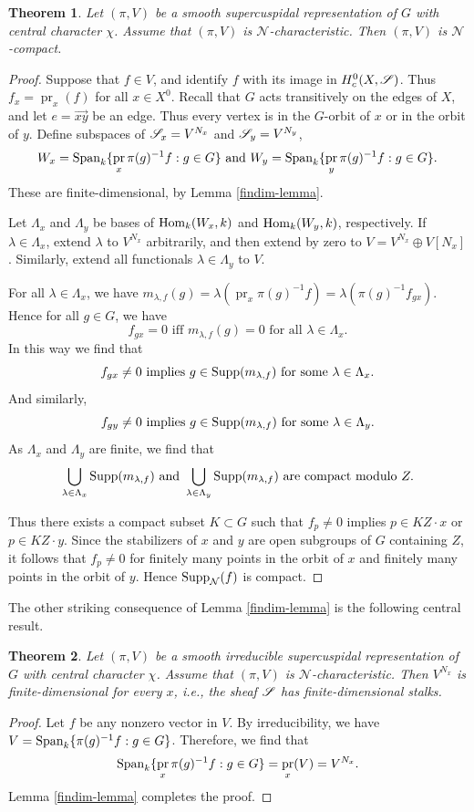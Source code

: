 \documentclass[letter]{amsart}
\newtheorem{thm}{Theorem}[section]
\theoremstyle{definition}
\theoremstyle{remark}
\numberwithin{thm}{section}
\numberwithin{equation}{section}
\renewcommand{\NN}{{\mathcal N}}
\DeclareMathOperator{\pr}{pr}
\begin{document}
\begin{thm}
\label{cusp-cpt}
Let $(\pi, V)$ be a smooth supercuspidal representation of $G$ with central character $\chi$.  Assume that $(\pi, V)$ is $\NN$-characteristic.  Then $(\pi, V)$ is $\NN$-compact.
\end{thm}
\begin{proof}
Suppose that $f \in V$, and identify $f$ with its image in $H_c^0(X, {\mathscr{S}})$.  Thus $f_x = \pr_x(f)$ for all $x \in X^0$.  Recall that $G$ acts transitively on the edges of $X$, and let $e = \vec {xy}$ be an edge.  Thus every vertex is in the $G$-orbit of $x$ or in the orbit of $y$.  Define subspaces of ${\mathscr{S}}_x = V^{N_x}$ and ${\mathscr{S}}_y = V^{N_y}$,
$$W_x = \Span_k \{ \pr_x \pi(g)^{-1} f : g \in G \} \text{ and } W_y = \Span_k \{ \pr_y \pi(g)^{-1} f : g \in G \}.$$
These are finite-dimensional, by Lemma \ref{findim-lemma}.  

Let $\Lambda_x$ and $\Lambda_y$ be bases of $\operatorname{Hom}_k(W_x, k)$ and $\operatorname{Hom}_k(W_y, k)$, respectively.  If $\lambda \in \Lambda_x$, extend $\lambda$ to $V^{N_x}$ arbitrarily, and then extend by zero to $V = V^{N_x} \oplus V[N_x]$.  Similarly, extend all functionals $\lambda \in \Lambda_y$ to $V$.  

For all $\lambda \in \Lambda_x$, we have $m_{\lambda, f}(g) = \lambda( \pr_x \pi(g)^{-1} f) = \lambda(\pi(g)^{-1} f_{gx})$.  Hence  for all $g \in G$, we have
$$f_{gx} = 0 \text{ iff } m_{\lambda, f}(g) = 0 \text{ for all } \lambda \in \Lambda_x.$$
In this way we find that
$$f_{gx} \neq 0 \text{ implies } g \in \operatorname{Supp}(m_{\lambda, f}) \text{ for some } \lambda \in \Lambda_x.$$
And similarly,
$$f_{gy} \neq 0 \text{ implies } g \in \operatorname{Supp}(m_{\lambda, f}) \text{ for some } \lambda \in \Lambda_y.$$
As $\Lambda_x$ and $\Lambda_y$ are finite, we find that
$$\bigcup_{\lambda \in \Lambda_x} \operatorname{Supp}(m_{\lambda, f}) \text{ and } \bigcup_{\lambda \in \Lambda_y} \operatorname{Supp}(m_{\lambda, f}) \text{ are compact modulo } Z.$$

Thus there exists a compact subset $K \subset G$ such that $f_p \neq 0$ implies $p \in K Z \cdot x$ or $p \in K Z \cdot y$.  Since the stabilizers of $x$ and $y$ are open subgroups of $G$ containing $Z$, it follows that $f_p \neq 0$ for finitely many points in the orbit of $x$ and finitely many points in the orbit of $y$.  Hence $\Supp_\NN(f)$ is compact.
\end{proof}

The other striking consequence of Lemma \ref{findim-lemma} is the following central result.
\begin{thm}
Let $(\pi, V)$ be a smooth irreducible supercuspidal representation of $G$ with central character $\chi$.  Assume that $(\pi, V)$ is $\NN$-characteristic.  Then $V^{N_x}$ is finite-dimensional for every $x$, i.e., the sheaf ${\mathscr{S}}$ has finite-dimensional stalks.
\end{thm}
\begin{proof}
Let $f$ be any nonzero vector in $V$.  By irreducibility, we have $V = \operatorname{Span}_k \{ \pi(g)^{-1} f : g \in G \}$.  Therefore, we find that
$$\Span_k \{ \pr_x \pi(g)^{-1} f : g \in G \} = \pr_x(V) = V^{N_x}.$$
Lemma \ref{findim-lemma} completes the proof.
\end{proof}
\end{document}
